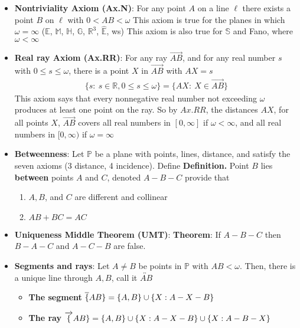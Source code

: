 \documentclass{report}
\begin{document}
\begin{itemize}
    \item \textbf{Nontriviality Axiom (Ax.N)}: For any point $A$ on a line $\ell$ there exists a point $B$ on $\ell$ with $0 < AB < \omega$
        \bigbreak \noindent 
        This axiom is true for the planes in which $\omega = \infty$ ($\mathbb{E}$, $\mathbb{M}$, $\mathbb{H}$, $\mathbb{G}$, $\mathbb{R}^{3}$, $\hat{\mathbb{E}} $, ws)
        \bigbreak \noindent 
        This axiom is also true for $\mathbb{S}$ and Fano, where $\omega < \infty $
    \item \textbf{Real ray Axiom (Ax.RR)}: For any ray $ \overrightarrow{AB}$, and for any real number $s $ with $0 \leq s \leq \omega$, there is a point $X$ in $\overrightarrow{AB}$ with $AX = s$
        \begin{align*}
            \{s:\ s \in \mathbb{R}, 0 \leq s \leq \omega \} = \{AX:\ X \in \overrightarrow{AB}\}
        \end{align*}
        This axiom says that every nonnegative real number not exceeding $\omega$ produces at least one point on the ray.
        \bigbreak \noindent 
        So by $Ax.RR$, the distances $AX$, for all points $X$, $ \overrightarrow{AB}$ covers all real numbers in $[0,\infty]$ if $\omega < \infty$, and all real numbers in $[0,\infty) $ if $\omega = \infty $
    \item \textbf{Betweenness}: Let $\mathbb{P}$ be a plane with points, lines, distance, and satisfy the seven axioms (3 distance, 4 incidence). Define
        \bigbreak \noindent 
        \textbf{Definition.} Point $B$ lies \textbf{between} points $A$ and $C$, denoted $A-B-C$ provide that
        \begin{enumerate}
            \item $A,B$, and $C$ are different and collinear
            \item $AB + BC = AC $
        \end{enumerate}
    \item \textbf{Uniqueness Middle Theorem (UMT)}:
        \bigbreak \noindent 
        \textbf{Theorem}: If $A-B-C$ then $B-A-C$ and $A-C-B$ are false.
    \item \textbf{Segments and rays}: Let $A\ne B$ be points in $ \mathbb{P}$ with $AB < \omega $. Then, there is a unique line through $A,B$, call it $ \overleftrightarrow{AB}$ 
        \begin{itemize}
            \item \textbf{The segment} $\overline\{AB\} = \{A,B\} \cup \{X: A-X-B\}$
            \item \textbf{The ray} $\overrightarrow\{AB\} = \{A,B\} \cup \{X: A-X-B\} \cup \{X: A-B-X\}$

\end{itemize}
\end{itemize}
\end{document}

